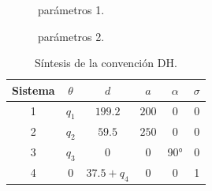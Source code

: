 \documentclass[a4paper,12pt]{article}
\begin{document}
\begin{figure}[H]
    \centering
    \begin{adjustbox}{scale = 0.66, max width=\columnwidth}
    \end{adjustbox}
    \caption{parámetros 1.}
\end{figure}

\begin{figure}[H]
    \centering
    \begin{adjustbox}{scale = 0.66, max width=\columnwidth}
    \end{adjustbox}
    \caption{parámetros 2.}
\end{figure}

\begin{table}[H]
    \centering
    \begin{tabular}{|c|c|c|c|c|c|}
    \hline
    Sistema & $\theta$  & $d$           & $a$    & $\alpha$ & $\sigma$ \\ \hline
    1       & $q_1$     & $199.2$       & $200$  & 0        & 0        \\ \hline
    2       & $q_2$     & $59.5$        & $250$  & 0        & 0        \\ \hline
    3       & $q_3$     & $0$           & $0$    & 90°      & 0        \\ \hline
    4       & $0$       & $37.5 + q_4$  & $0$    & 0        & 1        \\ \hline
    \end{tabular}
    \caption{Síntesis de la convención DH.}
    \label{sintesis_DH_scara}
\end{table}
\end{document}
